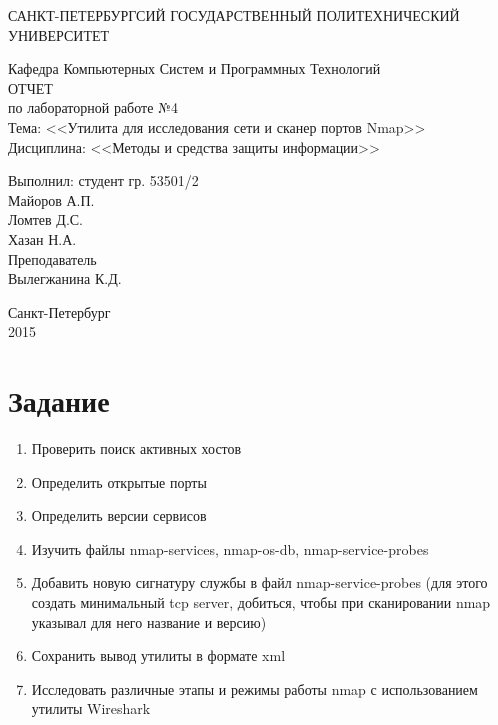 \documentclass[utf8x, 12pt]{G7-32}
\begin{document}
\frontmatter 


\begin{center} 

\large САНКТ-ПЕТЕРБУРГСИЙ ГОСУДАРСТВЕННЫЙ ПОЛИТЕХНИЧЕСКИЙ УНИВЕРСИТЕТ

\large Кафедра Компьютерных Систем и Программных Технологий \\[5.5cm] 

\huge ОТЧЕТ \\[0.6cm] %
\large по лабораторной работе №4\\
\large Тема: <<Утилита для исследования сети и сканер портов Nmap>>\\
\large Дисциплина: <<Методы и средства защиты информации>>\\[3.7cm]

\end{center} 

\begin{flushright}
Выполнил: студент гр. 53501/2 \\
Майоров А.П. \\
Ломтев Д.С. \\
Хазан Н.А.\\[1.2cm]


Преподаватель \\
Вылегжанина К.Д.
\end{flushright}


\vfill 

\begin{center} 
\large Санкт-Петербург \\
2015
\end{center} 

\thispagestyle{empty}



\thispagestyle{empty}
\setcounter{page}{0}
\tableofcontents
\clearpage
\mainmatter


\chapter{Задание}

\begin{enumerate}
	\item Проверить поиск активных хостов
	\item Определить открытые порты
	\item Определить версии сервисов
	\item Изучить файлы nmap-services, nmap-os-db, nmap-service-probes
	\item Добавить новую сигнатуру службы в файл nmap-service-probes (для этого создать минимальный tcp server, добиться, чтобы при сканировании nmap указывал для него название и версию)
	\item Сохранить вывод утилиты в формате xml
	\item Исследовать различные этапы и режимы работы nmap с использованием утилиты Wireshark
\end{enumerate}
\end{document}
